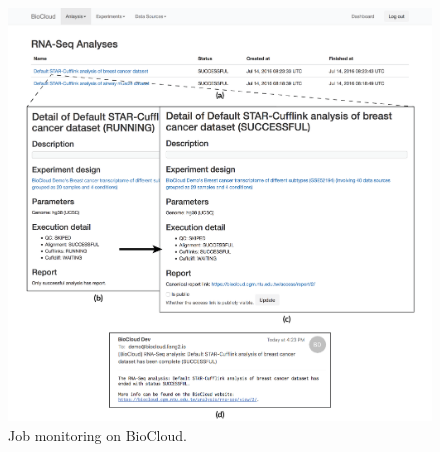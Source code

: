 \begin{figure}[!tb]
\centering
\includegraphics[width=1\textwidth]{images/biocloud_job_monitor}
\caption[Job monitoring on BioCloud]{
    Job monitoring on BioCloud.
}
\label{fig:biocloud-job-monitor}
\end{figure}

